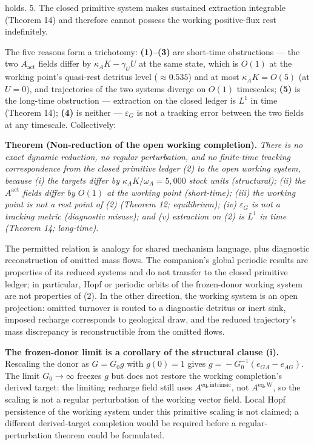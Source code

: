 \documentclass[11pt]{article}
\begin{document}
holds. 5. The closed primitive system makes sustained extraction integrable (Theorem 14) and therefore cannot possess the working positive-flux rest indefinitely.

The five reasons form a trichotomy: \textbf{(1)--(3)} are short-time obstructions --- the two \(A_{\mathrm{act}}\) fields differ by \(\kappa_AK-\gamma_UU\) at the same state, which is \(O(1)\) at the working point's quasi-rest detritus level (\(\approx0.535\)) and at most \(\kappa_AK=O(5)\) (at \(U=0\)), and trajectories of the two systems diverge on \(O(1)\) timescales; \textbf{(5)} is the long-time obstruction --- extraction on the closed ledger is \(L^1\) in time (Theorem 14); \textbf{(4)} is neither --- \(\varepsilon_G\) is not a tracking error between the two fields at any timescale. Collectively:

\textbf{Theorem (Non-reduction of the open working completion).} \emph{There is no exact dynamic reduction, no regular perturbation, and no finite-time tracking correspondence from the closed primitive ledger (2) to the open working system, because (i) the targets differ by \(\kappa_A K/\omega_A = 5{,}000\) stock units (structural); (ii) the \(A^{\mathrm{act}}\) fields differ by \(O(1)\) at the working point (short-time); (iii) the working point is not a rest point of (2) (Theorem 12; equilibrium); (iv) \(\varepsilon_G\) is not a tracking metric (diagnostic misuse); and (v) extraction on (2) is \(L^1\) in time (Theorem 14; long-time).}

The permitted relation is analogy for shared mechanism language, plus diagnostic reconstruction of omitted mass flows. The companion's global periodic results are properties of its reduced systems and do not transfer to the closed primitive ledger; in particular, Hopf or periodic orbits of the frozen-donor working system are not properties of (2). In the other direction, the working system is an open projection: omitted turnover is routed to a diagnostic detritus or inert sink, imposed recharge corresponds to geological draw, and the reduced trajectory's mass discrepancy is reconstructible from the omitted flows.

\textbf{The frozen-donor limit is a corollary of the structural clause (i).} Rescaling the donor as \(G = G_0 g\) with \(g(0) = 1\) gives \(\dot g =\allowbreak{} -G_0^{-1}(e_{GA} - e_{AG})\). The limit \(G_0 \to \infty\) freezes \(g\) but does not restore the working completion's derived target: the limiting recharge field still uses \(A^{\mathrm{eq,intrinsic}}\), not \(A^{\mathrm{eq,W}}\), so the scaling is not a regular perturbation of the working vector field. Local Hopf persistence of the working system under this primitive scaling is not claimed; a different derived-target completion would be required before a regular-perturbation theorem could be formulated.
\end{document}
